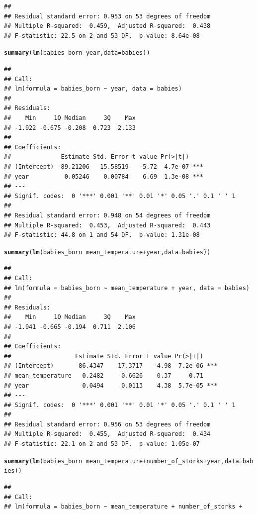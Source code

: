 \documentclass[12pt,a4paper]{scrartcl}\usepackage[]{graphicx}\usepackage[]{color}
\makeatletter
\newcommand{\hlopt}[1]{\textcolor[rgb]{0,0,0}{#1}}%
\newcommand{\hlstd}[1]{\textcolor[rgb]{0.345,0.345,0.345}{#1}}%
\newcommand{\hlkwc}[1]{\textcolor[rgb]{0.333,0.667,0.333}{#1}}%
\newcommand{\hlkwd}[1]{\textcolor[rgb]{0.737,0.353,0.396}{\textbf{#1}}}%
\newenvironment{kframe}{%
 \def\at@end@of@kframe{}%
 \ifinner\ifhmode%
  \def\at@end@of@kframe{\end{minipage}}%
  \begin{minipage}{\columnwidth}%
 \fi\fi%
 \def\FrameCommand##1{\hskip\@totalleftmargin \hskip-\fboxsep
 \colorbox{shadecolor}{##1}\hskip-\fboxsep
     \hskip-\linewidth \hskip-\@totalleftmargin \hskip\columnwidth}%
 \MakeFramed {\advance\hsize-\width
   \@totalleftmargin\z@ \linewidth\hsize
   \@setminipage}}%
 {\par\unskip\endMakeFramed%
 \at@end@of@kframe}
\newenvironment{knitrout}{}{} %
\makeatother
\begin{document}
\begin{Answer}
\begin{knitrout}
\begin{kframe}
\begin{verbatim}
## 
## Residual standard error: 0.953 on 53 degrees of freedom
## Multiple R-squared:  0.459,	Adjusted R-squared:  0.438 
## F-statistic: 22.5 on 2 and 53 DF,  p-value: 8.64e-08
\end{verbatim}
\begin{alltt}
  \hlkwd{summary}\hlstd{(}\hlkwd{lm}\hlstd{(babies_born} \hlopt{~} \hlstd{year,} \hlkwc{data} \hlstd{= babies))}
\end{alltt}
\begin{verbatim}
## 
## Call:
## lm(formula = babies_born ~ year, data = babies)
## 
## Residuals:
##    Min     1Q Median     3Q    Max 
## -1.922 -0.675 -0.208  0.723  2.133 
## 
## Coefficients:
##              Estimate Std. Error t value Pr(>|t|)    
## (Intercept) -89.21206   15.58519   -5.72  4.7e-07 ***
## year          0.05246    0.00784    6.69  1.3e-08 ***
## ---
## Signif. codes:  0 '***' 0.001 '**' 0.01 '*' 0.05 '.' 0.1 ' ' 1
## 
## Residual standard error: 0.948 on 54 degrees of freedom
## Multiple R-squared:  0.453,	Adjusted R-squared:  0.443 
## F-statistic: 44.8 on 1 and 54 DF,  p-value: 1.31e-08
\end{verbatim}
\begin{alltt}
  \hlkwd{summary}\hlstd{(}\hlkwd{lm}\hlstd{(babies_born} \hlopt{~} \hlstd{mean_temperature}\hlopt{+} \hlstd{year,} \hlkwc{data} \hlstd{= babies))}
\end{alltt}
\begin{verbatim}
## 
## Call:
## lm(formula = babies_born ~ mean_temperature + year, data = babies)
## 
## Residuals:
##    Min     1Q Median     3Q    Max 
## -1.941 -0.665 -0.194  0.711  2.106 
## 
## Coefficients:
##                  Estimate Std. Error t value Pr(>|t|)    
## (Intercept)      -86.4347    17.3717   -4.98  7.2e-06 ***
## mean_temperature   0.2482     0.6626    0.37     0.71    
## year               0.0494     0.0113    4.38  5.7e-05 ***
## ---
## Signif. codes:  0 '***' 0.001 '**' 0.01 '*' 0.05 '.' 0.1 ' ' 1
## 
## Residual standard error: 0.956 on 53 degrees of freedom
## Multiple R-squared:  0.455,	Adjusted R-squared:  0.434 
## F-statistic: 22.1 on 2 and 53 DF,  p-value: 1.05e-07
\end{verbatim}
\begin{alltt}
  \hlkwd{summary}\hlstd{(}\hlkwd{lm}\hlstd{(babies_born} \hlopt{~} \hlstd{mean_temperature}\hlopt{+} \hlstd{number_of_storks} \hlopt{+} \hlstd{year,} \hlkwc{data} \hlstd{= babies))}
\end{alltt}
\begin{verbatim}
## 
## Call:
## lm(formula = babies_born ~ mean_temperature + number_of_storks + 

\end{verbatim}
\end{kframe}
\end{knitrout}
\end{Answer}
\end{document}
